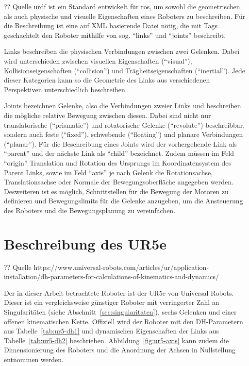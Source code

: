?? Quelle
\ac{urdf} ist ein Standard entwickelt für \ac{ros}, um sowohl die geometrischen als auch physische und visuelle Eigenschaften eines Roboters zu beschreiben.
Für die Beschreibung ist eine auf XML basierende Datei nötig, die mit Tags geschachtelt den Roboter mithilfe von sog. \enquote{links} und \enquote{joints} beschreibt.

Links beschreiben die physischen Verbindungen zwischen zwei Gelenken.
Dabei wird unterschieden zwischen visuellen Eigenschaften (\enquote{visual}), Kollisionseigenschaften (\enquote{collision}) und Trägheitseigenschaften (\enquote{inertial}).
Jede dieser Kategorien kann so die Geometrie des Links aus verschiedenen Perspektiven unterschiedlich beschreiben

Joints bezeichnen Gelenke, also die Verbindungen zweier Links und beschreiben die mögliche relative Bewegung zwischen diesen.
Dabei sind nicht nur translatorische (\enquote{prismatic}) und rotatorische Gelenke (\enquote{revolute}) beschreibbar, sondern auch feste (\enquote{fixed}), schwebende (\enquote{floating}) und planare Verbindungen (\enquote{planar}).
Für die Beschreibung eines Joints wird der vorhergehende Link als \enquote{parent} und der nächste Link als \enquote{child} bezeichnet.
Zudem müssen im Feld \enquote{origin} Translation und Rotation des Ursprungs im Koordinatensystem des Parent Links, sowie im Feld \enquote{axis} je nach Gelenk die Rotationsachse, Translationsachse oder Normale der Bewegungsoberfläche angegeben werden.
Desweiteren ist es möglich, Schnittstellen für die Bewegung der Motoren zu definieren und Bewegungslimits für die Gelenke anzugeben, um die Ansteuerung des Roboters und die Bewegungsplanung zu vereinfachen.


\section{Beschreibung des UR5e}\label{sec:ur5-in-dh}
?? Quelle https://www.universal-robots.com/articles/ur/application-installation/dh-parameters-for-calculations-of-kinematics-and-dynamics/

Der in dieser Arbeit betrachtete Roboter ist der UR5e von Universal Robots.
Dieser ist ein vergleichsweise günstiger Roboter mit verringerter Zahl an Singularitäten (siehe Abschnitt~\ref{sec:singularitaten}), sechs Gelenken und einer offenen kinematischen Kette.
Offiziell wird der Roboter mit den DH-Parametern aus Tabelle~\ref{tab:ur5-dh1} und dynamischen Eigenschaften der Links aus Tabelle~\ref{tab:ur5-dh2} beschrieben.
Abbildung~\ref{fig:ur5-axis} kann zudem die Dimensionierung des Roboters und die Anordnung der Achsen in Nullstellung entnommen werden.

